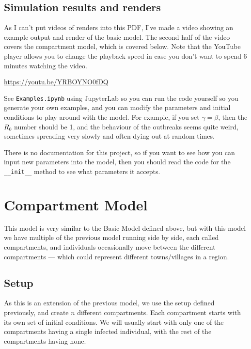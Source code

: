 \documentclass[11pt]{article}
\begin{document}
\subsection{Simulation results and renders}
As I can't put videos of renders into this PDF, I've made a video showing an example output and render of the basic model. The second half of the video covers the compartment model, which is covered below. Note that the YouTube player allows you to change the playback speed in case you don't want to spend 6 minutes watching the video.

\vspace{4px}
\url{https://youtu.be/YRBOYNO0fDQ}
\vspace{4px}

See \texttt{Examples.ipynb} using JupyterLab so you can run the code yourself so you generate your own examples, and you can modify the parameters and initial conditions to play around with the model. For example, if you set $\gamma=\beta$, then the $R_0$ number should be 1, and the behaviour of the outbreaks seems quite weird, sometimes spreading very slowly and often dying out at random times.

There is no documentation for this project, so if you want to see how you can input new parameters into the model, then you should read the code for the \texttt{\_\_init\_\_} method to see what parameters it accepts.

\section{Compartment Model}
This model is very similar to the Basic Model defined above, but with this model we have multiple of the previous model running side by side, each called compartments, and individuals occasionally move between the different compartments — which could represent different towns/villages in a region.
\subsection{Setup}
As this is an extension of the previous model, we use the setup defined previously, and create $n$ different compartments. Each compartment starts with its own set of initial conditions. We will usually start with only one of the compartments having a single infected individual, with the rest of the compartments having none.
\end{document}
